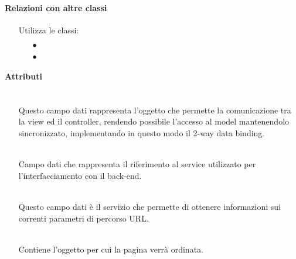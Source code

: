 \paragraph*{Relazioni con altre classi}
\begin{itemize}


\item[] Utilizza le classi:
\begin{itemize}
\item[$\bullet$] 
\item[$\bullet$] 
\end{itemize}
\end{itemize}

\paragraph*{Attributi}
\begin{itemize}
\item[]  \\ Questo campo dati rappresenta l'oggetto che permette la comunicazione tra la view ed il controller, rendendo possibile l’accesso al model mantenendolo sincronizzato, implementando in questo modo il 2-way data binding.
\item[]  \\ Campo dati che rappresenta il riferimento al service utilizzato per l'interfacciamento con il back-end.
\item[]  \\ Questo campo dati è il servizio che permette di ottenere informazioni sui correnti parametri di percorso URL.
\item[]  \\ Contiene l'oggetto per cui la pagina verrà ordinata.
\end{itemize}


